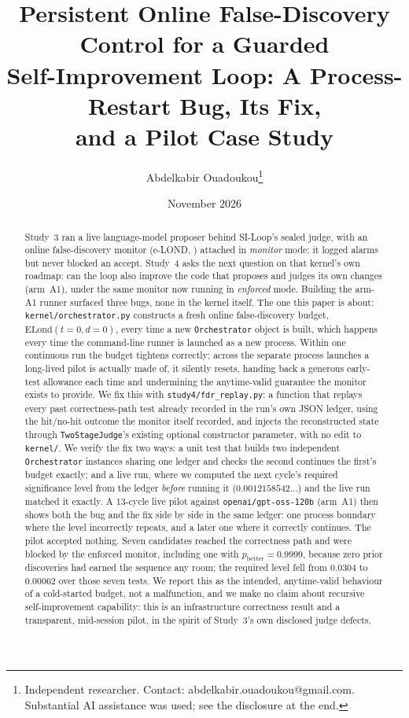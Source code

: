 \documentclass[11pt]{article}
\title{Persistent Online False-Discovery Control for a Guarded\\[2pt] Self-Improvement Loop: A Process-Restart Bug, Its Fix,\\[2pt] and a Pilot Case Study}
\author{Abdelkabir Ouadoukou\thanks{Independent researcher. Contact: abdelkabir.ouadoukou@gmail.com.
Substantial AI assistance was used; see the disclosure at the end.}}
\date{November 2026\\[9pt]{\small\repoline}}
\begin{document}
\sloppy
\maketitle
\vspace{-1.2em}

\begin{abstract}
Study~3 \citep{ouadoukou2026study3} ran a live language-model proposer behind SI-Loop's sealed judge, with an online false-discovery monitor (e-LOND, \citealp{xu2024elond}) attached in \emph{monitor} mode: it logged alarms but never blocked an accept. Study~4 asks the next question on that kernel's own roadmap: can the loop also improve the code that proposes and judges its own changes (arm~A1), under the same monitor now running in \emph{enforced} mode. Building the arm-A1 runner surfaced three bugs, none in the kernel itself. The one this paper is about: \texttt{kernel/orchestrator.py} constructs a fresh online false-discovery budget, $\mathrm{ELond}(t{=}0,d{=}0)$, every time a new \texttt{Orchestrator} object is built, which happens every time the command-line runner is launched as a new process. Within one continuous run the budget tightens correctly; across the separate process launches a long-lived pilot is actually made of, it silently resets, handing back a generous early-test allowance each time and undermining the anytime-valid guarantee the monitor exists to provide. We fix this with \texttt{study4/fdr\_replay.py}: a function that replays every past correctness-path test already recorded in the run's own JSON ledger, using the hit/no-hit outcome the monitor itself recorded, and injects the reconstructed state through \texttt{TwoStageJudge}'s existing optional constructor parameter, with no edit to \texttt{kernel/}. We verify the fix two ways: a unit test that builds two independent \texttt{Orchestrator} instances sharing one ledger and checks the second continues the first's budget exactly; and a live run, where we computed the next cycle's required significance level from the ledger \emph{before} running it ($0.0012158542\ldots$) and the live run matched it exactly. A 13-cycle live pilot against \texttt{openai/gpt-oss-120b} (arm~A1) then shows both the bug and the fix side by side in the same ledger: one process boundary where the level incorrectly repeats, and a later one where it correctly continues. The pilot accepted nothing. Seven candidates reached the correctness path and were blocked by the enforced monitor, including one with $p_{\text{better}}=0.9999$, because zero prior discoveries had earned the sequence any room; the required level fell from $0.0304$ to $0.00062$ over those seven tests. We report this as the intended, anytime-valid behaviour of a cold-started budget, not a malfunction, and we make no claim about recursive self-improvement capability: this is an infrastructure correctness result and a transparent, mid-session pilot, in the spirit of Study~3's own disclosed judge defects.
\end{abstract}
\end{document}
